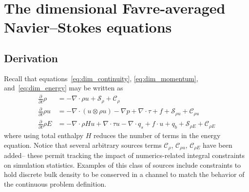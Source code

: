 \documentclass[letterpaper,11pt,nointlimits,reqno,draft]{amsbook}
\newcommand{\Ssd}{\ensuremath{\mathcal{S}}} %
\newcommand{\Cs}{\ensuremath{\mathcal{C}}}  %
\begin{document}
\section{The dimensional Favre-averaged Navier--Stokes equations}

\subsection{Derivation}

Recall that equations~\eqref{eq:dim_continuity}, \eqref{eq:dim_momentum},
and~\eqref{eq:dim_energy} may be written as
\begin{align}
    \frac{\partial}{\partial{}t}\rho
&=
  - \nabla\cdot\rho{}u
  + \Ssd_{\rho{}}
  + \Cs_{\rho{}}
\\
    \frac{\partial{}}{\partial{}t}\rho{}u
&=
  - \nabla\cdot(u\otimes{}\rho{}u)
  - \nabla{}p + \nabla\cdot{}\tau + f
  + \Ssd_{\rho{} u}
  + \Cs_{\rho{}u}
\\
    \frac{\partial}{\partial{}t} \rho{}E
&=
  - \nabla\cdot{}\rho{}Hu
  + \nabla\cdot{}\tau{}u
  - \nabla\cdot{}q_{s}
  + f\cdot{}u
  + q_b
  + \Ssd_{\rho{} E}
  + \Cs_{\rho{}E}
\end{align}
where using total enthalpy $H$ reduces the number of terms in the energy
equation.  Notice that several arbitrary sources terms $\Cs_{\rho{}}$,
$\Cs_{\rho{}u}$, $\Cs_{\rho{}E}$ have been added-- these permit tracking the
impact of numerics-related integral constraints on simulation statistics.
Examples of this class of sources include constraints to hold discrete
bulk density to be conserved in a channel to match the behavior of the
continuous problem definition.
\end{document}
